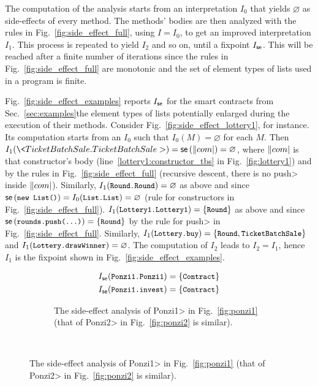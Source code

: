 The computation of the analysis
starts from an interpretation $I_0$ that yields $\varnothing$ as
side-effects of every method. The methods' bodies are then analyzed with the rules
in Fig.~\ref{fig:side_effect_full}, using $I=I_0$, to get an improved interpretation $I_1$.
This process is repeated to yield $I_2$ and so on, until a fixpoint $I_{\mathsf{se}}$.
This will be reached after a finite number of iterations
since the rules in Fig.~\ref{fig:side_effect_full} are monotonic and the set of element types
of lists used in a program is finite.

\begin{example}\label{ex:side_effect}
  Fig.~\ref{fig:side_effect_examples} reports $I_{\mathsf{se}}$ for the smart contracts from
  Sec.~\ref{sec:examples}\ie the element types of lists potentially enlarged during
  the execution of their methods.
  Consider Fig.~\ref{fig:side_effect_lottery1}, for instance.
  Its computation starts from an $I_0$ such that $I_0(M)=\varnothing$ for each $M$.
  Then $I_1(\<TicketBatchSale.TicketBatchSale>)=\sideeffect{\com}=\varnothing$,
  where $\com$ is that constructor's body
  (line~\ref{lottery1:constructor_tbs} in Fig.~\ref{fig:lottery1}) and
  by the rules in Fig.~\ref{fig:side_effect_full} (recursive descent, there is no \<push> inside
  $\com$). Similarly, $I_1(\<Round.Round>)=\varnothing$ as above and
  since $\sideeffect{\<new List()>}=I_0(\<List.List>)=\varnothing$ (rule for
  constructors in Fig.~\ref{fig:side_effect_full}).
  $I_1(\<Lottery1.Lottery1>)=\{\<Round>\}$ as above
  and since $\sideeffect{\<rounds.push(...)>}=\{\<Round>\}$ by the rule for \<push>
  in Fig.~\ref{fig:side_effect_full}. Similarly,
  $I_1(\<Lottery.buy>)=\{\<Round>,\<TicketBatchSale>\}$ and
  $I_1(\<Lottery.drawWinner>)=\varnothing$. The computation of $I_2$ leads to
  $I_2=I_1$, hence $I_1$ is the fixpoint shown in Fig.~\ref{fig:side_effect_examples}.
  \begin{figure}[t]
    \begin{center}
    \begin{subfigure}{\textwidth}
      \begin{align*}
        \intsideeffect(\<Ponzi1.Ponzi1>)&=\{\<Contract>\}\\
        \intsideeffect(\<Ponzi1.invest>)&=\{\<Contract>\}
      \end{align*}
      \caption{The side-effect analysis of \<Ponzi1> in Fig.~\ref{fig:ponzi1}
      (that of \<Ponzi2> in Fig.~\ref{fig:ponzi2} is similar).}
    \end{subfigure}\\

\end{center}
\end{figure}
\end{example}
